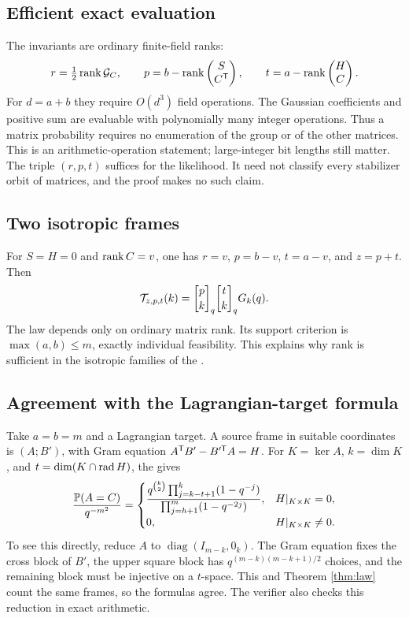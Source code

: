 \subsection{Efficient exact evaluation}

The invariants are ordinary finite-field ranks:
\[
 r=\tfrac12\operatorname{rank}\mathcal G_C,\qquad
 p=b-\operatorname{rank}\begin{pmatrix}S\\C^{\mathsf T}\end{pmatrix},\qquad
 t=a-\operatorname{rank}\begin{pmatrix}H\\C\end{pmatrix}.
\]
For $d=a+b$ they require $O(d^3)$ field operations.
The Gaussian coefficients and positive sum are evaluable with
polynomially many integer operations. Thus a matrix probability
requires no enumeration of the group or of the other matrices.
This is an arithmetic-operation statement; large-integer bit lengths
still matter.
The triple $(r,p,t)$ suffices for the likelihood. It need not classify
every stabilizer orbit of matrices, and the proof makes no such claim.

\subsection{Two isotropic frames}

For $S=H=0$ and $\operatorname{rank} C=v$, one has
$r=v$, $p=b-v$, $t=a-v$, and $z=p+t$. Then
\[
 \mathcal T_{z,p,t}(k)=\gb pk\gb tkG_k(q).
\]
The law depends only on ordinary matrix rank. Its support criterion
is $\max(a,b)\le m$, exactly individual feasibility. This explains
why rank is sufficient in the isotropic families of the \Article{}.

\subsection{Agreement with the Lagrangian-target formula}

Take $a=b=m$ and a Lagrangian target. A source frame in suitable
coordinates is $(A;B')$, with Gram equation
$A^{\mathsf T}B'-B'^{\mathsf T}A=H$.
For $K=\ker A$, $k=\dim K$, and $t=\dim(K\cap\operatorname{rad} H)$, the
\Article{} gives
\begin{equation}\label{eq:oldlag}
 \frac{\mathbb P(A=C)}{q^{-m^2}}=
 \begin{cases}
 \displaystyle
 \frac{q^{\binom k2}\prod_{j=k-t+1}^{k}(1-q^{-j})}
 {\prod_{j=h+1}^{m}(1-q^{-2j})},&H|_{K\times K}=0,\\[6pt]
 0,&H|_{K\times K}\ne0.
 \end{cases}
\end{equation}
To see this directly, reduce $A$ to
$\operatorname{diag}(I_{m-k},0_k)$. The Gram equation fixes the cross
block of $B'$, the upper square block has
$q^{(m-k)(m-k+1)/2}$ choices, and the remaining block must be
injective on a $t$-space. This and Theorem \ref{thm:law} count the
same frames, so the formulas agree. The verifier also checks this
reduction in exact arithmetic.

